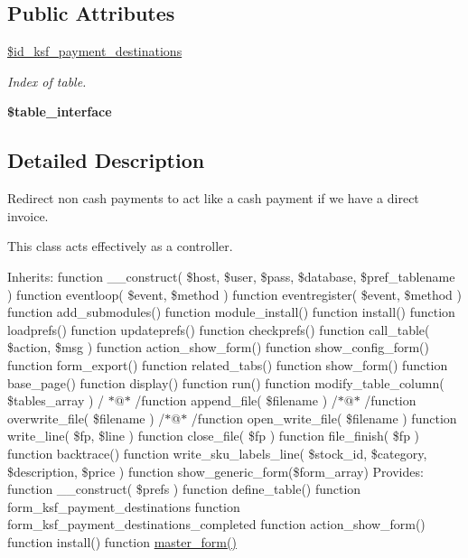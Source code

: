 \subsection*{Public Attributes}
\begin{DoxyCompactItemize}
\item 
\hypertarget{classksf__payment__destinations_a8959722e1f074ff2adf1084521a0e6af}{}\label{classksf__payment__destinations_a8959722e1f074ff2adf1084521a0e6af} 
\hyperlink{classksf__payment__destinations_a8959722e1f074ff2adf1084521a0e6af}{\$id\+\_\+ksf\+\_\+payment\+\_\+destinations}
\begin{DoxyCompactList}\small\item\em Index of table. \end{DoxyCompactList}\item 
\hypertarget{classksf__payment__destinations_ac8b962067dab478764075d7159f38e2d}{}\label{classksf__payment__destinations_ac8b962067dab478764075d7159f38e2d} 
{\bfseries \$table\+\_\+interface}
\end{DoxyCompactItemize}


\subsection{Detailed Description}
Redirect non cash payments to act like a cash payment if we have a direct invoice.

This class acts effectively as a controller.

Inherits\+: function \+\_\+\+\_\+construct( \$host, \$user, \$pass, \$database, \$pref\+\_\+tablename ) function eventloop( \$event, \$method ) function eventregister( \$event, \$method ) function add\+\_\+submodules() function module\+\_\+install() function install() function loadprefs() function updateprefs() function checkprefs() function call\+\_\+table( \$action, \$msg ) function action\+\_\+show\+\_\+form() function show\+\_\+config\+\_\+form() function form\+\_\+export() function related\+\_\+tabs() function show\+\_\+form() function base\+\_\+page() function display() function run() function modify\+\_\+table\+\_\+column( \$tables\+\_\+array ) / $\ast$@$\ast$ /function append\+\_\+file( \$filename ) /$\ast$@$\ast$ /function overwrite\+\_\+file( \$filename ) /$\ast$@$\ast$ /function open\+\_\+write\+\_\+file( \$filename ) function write\+\_\+line( \$fp, \$line ) function close\+\_\+file( \$fp ) function file\+\_\+finish( \$fp ) function backtrace() function write\+\_\+sku\+\_\+labels\+\_\+line( \$stock\+\_\+id, \$category, \$description, \$price ) function show\+\_\+generic\+\_\+form(\$form\+\_\+array) Provides\+: function \+\_\+\+\_\+construct( \$prefs ) function define\+\_\+table() function form\+\_\+ksf\+\_\+payment\+\_\+destinations function form\+\_\+ksf\+\_\+payment\+\_\+destinations\+\_\+completed function action\+\_\+show\+\_\+form() function install() function \hyperlink{classksf__payment__destinations_af957fcc97c11896268883359ff45ddd4}{master\+\_\+form()} 


